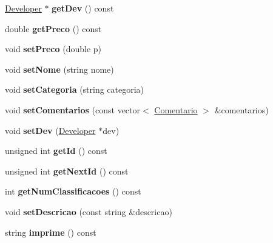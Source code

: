 \begin{DoxyCompactItemize}
\item 
\hypertarget{class_app_a94de3c0569d8c300a634c5e058da70da}{\hyperlink{class_developer}{Developer} $\ast$ {\bfseries get\+Dev} () const }\label{class_app_a94de3c0569d8c300a634c5e058da70da}

\item 
\hypertarget{class_app_a203cc8ebea02cf4cabb736c3c4e8bc51}{double {\bfseries get\+Preco} () const }\label{class_app_a203cc8ebea02cf4cabb736c3c4e8bc51}

\item 
\hypertarget{class_app_ab9723a9ef1383d41b9960e07de4c5691}{void {\bfseries set\+Preco} (double p)}\label{class_app_ab9723a9ef1383d41b9960e07de4c5691}

\item 
\hypertarget{class_app_a779936463595bd7babe3fabdd3b81530}{void {\bfseries set\+Nome} (string nome)}\label{class_app_a779936463595bd7babe3fabdd3b81530}

\item 
\hypertarget{class_app_add85e6926cb052edac84f210889df476}{void {\bfseries set\+Categoria} (string categoria)}\label{class_app_add85e6926cb052edac84f210889df476}

\item 
\hypertarget{class_app_a40d8afcc9663054f4f5445a37dfd542d}{void {\bfseries set\+Comentarios} (const vector$<$ \hyperlink{class_comentario}{Comentario} $>$ \&comentarios)}\label{class_app_a40d8afcc9663054f4f5445a37dfd542d}

\item 
\hypertarget{class_app_aa2d4de1233b4a07def3cdae0d165d4cf}{void {\bfseries set\+Dev} (\hyperlink{class_developer}{Developer} $\ast$dev)}\label{class_app_aa2d4de1233b4a07def3cdae0d165d4cf}

\item 
\hypertarget{class_app_a17d1e4e52f2357b25437d21d21728bcb}{unsigned int {\bfseries get\+Id} () const }\label{class_app_a17d1e4e52f2357b25437d21d21728bcb}

\item 
\hypertarget{class_app_ae8bc0359346587f5e98885e4bdba3db0}{unsigned int {\bfseries get\+Next\+Id} () const }\label{class_app_ae8bc0359346587f5e98885e4bdba3db0}

\item 
\hypertarget{class_app_afca72f5119a5fbb1c7972d8085abc2c7}{int {\bfseries get\+Num\+Classificacoes} () const }\label{class_app_afca72f5119a5fbb1c7972d8085abc2c7}

\item 
\hypertarget{class_app_af0140ea32801ddf481e61fda65024ba8}{void {\bfseries set\+Descricao} (const string \&descricao)}\label{class_app_af0140ea32801ddf481e61fda65024ba8}

\item 
\hypertarget{class_app_af3a98845da9ba10769df22e1e21f3db0}{string {\bfseries imprime} () const }\label{class_app_af3a98845da9ba10769df22e1e21f3db0}

\end{DoxyCompactItemize}
